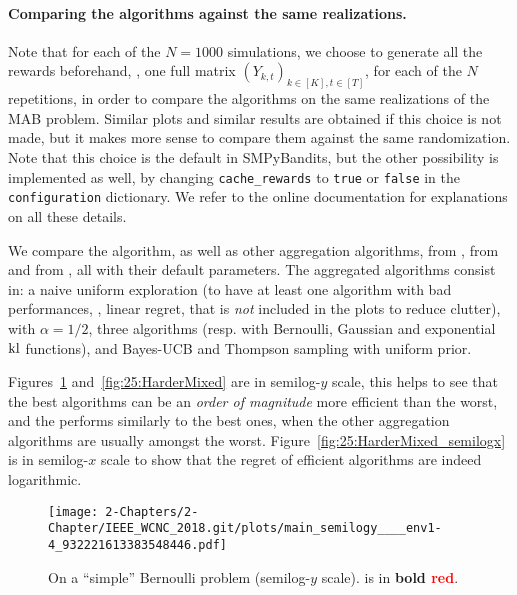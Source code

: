 \paragraph{Comparing the algorithms against the same realizations.}
%
Note that for each of the $N=1000$ simulations, we choose to generate all the rewards beforehand, \ie, one full matrix $(Y_{k,t})_{k\in[K], t\in[T]}$, for each of the $N$ repetitions, in order to compare the algorithms on the same realizations of the MAB problem.
%
Similar plots and similar results are obtained if this choice is not made, but it makes more sense to compare them against the same randomization. Note that this choice is the default in SMPyBandits, but the other possibility is implemented as well, by changing \texttt{cache\_rewards} to \texttt{true} or \texttt{false} in the \texttt{configuration} dictionary.
We refer to the online documentation for explanations on all these details.

We compare the \Aggr{} algorithm,
as well as other aggregation algorithms, \ExpQ{} from \cite{Bubeck12},
\CORRAL{} from \cite{Agarwal16} and \LearnExp{} from \cite{Singla17}, all with their default parameters.
%
The aggregated algorithms consist in:
a naive uniform exploration (to have at least one algorithm with bad performances, \ie, linear regret, that is \emph{not} included in the plots to reduce clutter),
\UCB{} with $\alpha=1/2$, three \klUCB{} algorithms (resp. with Bernoulli, Gaussian and exponential $\mathrm{kl}$ functions), and Bayes-UCB and Thompson sampling with uniform prior.

Figures~\ref{fig:25:EasyBernoulli} and~\ref{fig:25:HarderMixed} are in semilog-$y$ scale, this helps to see that the best algorithms can be an \emph{order of magnitude} more efficient than the worst, and the \Aggr{} performs similarly to the best ones, when the other aggregation algorithms are usually amongst the worst.
Figure~\ref{fig:25:HarderMixed_semilogx} is in semilog-$x$ scale to show that the regret of efficient algorithms are indeed logarithmic.


\begin{figure}[h!]  %
	\centering
	\texttt{[image: 2-Chapters/2-Chapter/IEEE\_WCNC\_2018.git/plots/main\_semilogy\_\_\_\_env1-4\_932221613383548446.pdf]}
	\caption[On a ``simple'' Bernoulli problem (semilog-$y$ scale). \Aggr{} is in bold red.]{On a ``simple'' Bernoulli problem (semilog-$y$ scale). \Aggr{} is in \textbf{bold \textcolor{red}{red}}.}
	\label{fig:25:EasyBernoulli}
\end{figure}

